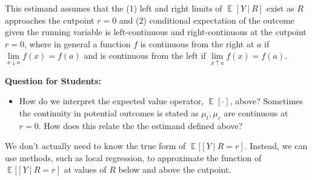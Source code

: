 \documentclass[11pt,leqno]{article}\usepackage[]{graphicx}\usepackage[]{color}
\newcommand\given[1][]{\:#1\vert\:}
\theoremstyle{newstyle}
\DeclareMathOperator{\E}{\mathbb{E}}
\begin{document}
This estimand assumes that the (1) left and right limits of $\E\left[Y \given R \right]$ exist as $R$ approaches the cutpoint $r = 0$ and (2) conditional expectation of the outcome given the running variable is left-continuous and right-continuous at the cutpoint $r = 0$, where in general a function $f$ is continuous from the right at $a$ if $\lim \limits_{x \downarrow a} f(x) = f(a)$ and is continuous from the left if $\lim \limits_{x \uparrow a} f(x) = f(a)$.

\vspace{5mm}
\textbf{Question for Students:}
\vspace{-5mm}
\begin{itemize}\itemsep1pt
\item How do we interpret the expected value operator, $\E\left[\cdot\right]$, above? Sometimes the continuity in potential outcomes is stated as $\mu_t, \mu_c$ are continuous at $r = 0$. How does this relate the the estimand defined above?
\end{itemize}

We don't actually need to know the true form of $\E[\left[Y \given R = r\right]$. Instead, we can use methods, such as local regression, to approximate the function of $\E[\left[Y \given R = r\right]$ at values of $R$ below and above the cutpoint.
\end{document}
